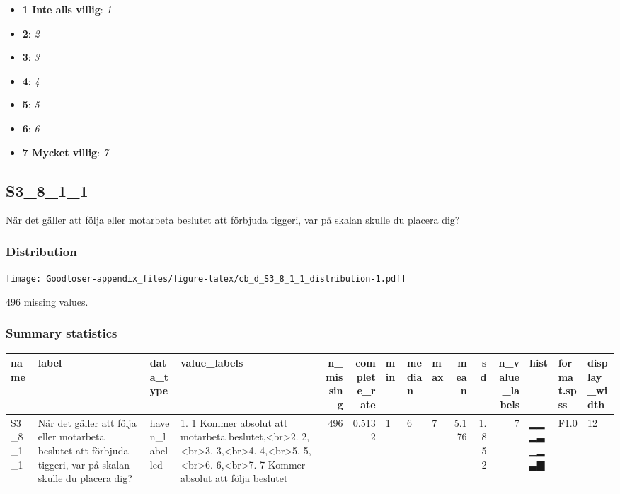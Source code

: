\documentclass[
]{book}
\providecommand{\tightlist}{%
  \setlength{\itemsep}{0pt}\setlength{\parskip}{0pt}}
\begin{document}
\begin{itemize}
\tightlist
\item
  \textbf{1 Inte alls villig}: \emph{1}
\item
  \textbf{2}: \emph{2}
\item
  \textbf{3}: \emph{3}
\item
  \textbf{4}: \emph{4}
\item
  \textbf{5}: \emph{5}
\item
  \textbf{6}: \emph{6}
\item
  \textbf{7 Mycket villig}: \emph{7}
\end{itemize}

\hypertarget{S3_8_1_1}{%
\subsection{S3\_8\_1\_1}\label{S3_8_1_1}}

När det gäller att följa eller motarbeta beslutet att förbjuda tiggeri, var på skalan skulle du placera dig?

\hypertarget{S3_8_1_1_distribution}{%
\subsubsection{Distribution}\label{S3_8_1_1_distribution}}

\texttt{[image: Goodloser-appendix\_files/figure-latex/cb\_d\_S3\_8\_1\_1\_distribution-1.pdf]}

496 missing values.

\hypertarget{S3_8_1_1_summary}{%
\subsubsection{Summary statistics}\label{S3_8_1_1_summary}}

\begin{tabular}{l|l|l|l|r|r|l|l|l|r|r|r|l|l|l}
\hline
name & label & data_type & value_labels & n_missing & complete_rate & min & median & max & mean & sd & n_value_labels & hist & format.spss & display_width\\
\hline
S3_8_1_1 & När det gäller att följa eller motarbeta beslutet att förbjuda tiggeri, var på skalan skulle du placera dig? & haven_labelled & 1. 1 Kommer absolut att motarbeta beslutet,<br>2. 2,<br>3. 3,<br>4. 4,<br>5. 5,<br>6. 6,<br>7. 7 Kommer absolut att följa beslutet & 496 & 0.5132 & 1 & 6 & 7 & 5.176 & 1.852 & 7 & ▁▁▂▃▁▂▃▇ & F1.0 & 12\\
\hline
\end{tabular}
\end{document}

